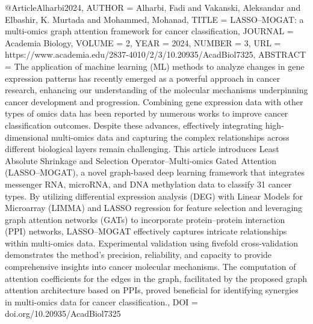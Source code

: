 @Article{Alharbi2024,
AUTHOR = {Alharbi, Fadi and Vakanski, Aleksandar and Elbashir, K. Murtada and Mohammed, Mohanad},
TITLE = {LASSO–MOGAT: a multi-omics graph attention framework for cancer classification},
JOURNAL = {Academia Biology},
VOLUME = {2},
YEAR = {2024},
NUMBER = {3},
URL = {https://www.academia.edu/2837-4010/2/3/10.20935/AcadBiol7325},
ABSTRACT = {The application of machine learning (ML) methods to analyze changes in gene expression patterns has recently emerged as a powerful approach in cancer research, enhancing our understanding of the molecular mechanisms underpinning cancer development and progression. Combining gene expression data with other types of omics data has been reported by numerous works to improve cancer classification outcomes. Despite these advances, effectively integrating high-dimensional multi-omics data and capturing the complex relationships across different biological layers remain challenging. This article introduces Least Absolute Shrinkage and Selection Operator–Multi-omics Gated Attention (LASSO–MOGAT), a novel graph-based deep learning framework that integrates messenger RNA, microRNA, and DNA methylation data to classify 31 cancer types. By utilizing differential expression analysis (DEG) with Linear Models for Microarray (LIMMA) and LASSO regression for feature selection and leveraging graph attention networks (GATs) to incorporate protein–protein interaction (PPI) networks, LASSO–MOGAT effectively captures intricate relationships within multi-omics data. Experimental validation using fivefold cross-validation demonstrates the method’s precision, reliability, and capacity to provide comprehensive insights into cancer molecular mechanisms. The computation of attention coefficients for the edges in the graph, facilitated by the proposed graph attention architecture based on PPIs, proved beneficial for identifying synergies in multi-omics data for cancer classification.},
DOI = {doi.org/10.20935/AcadBiol7325}
}